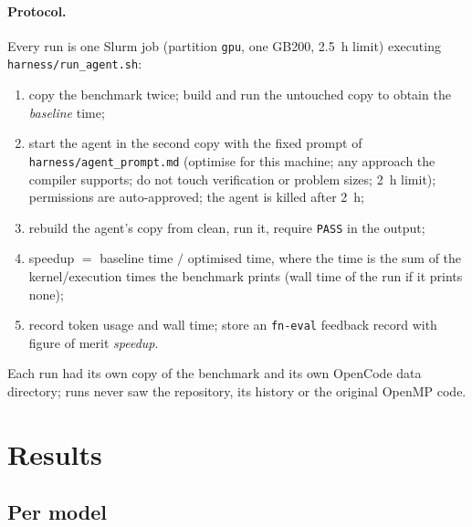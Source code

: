 \documentclass[11pt,a4paper]{article}
\begin{document}
\paragraph{Protocol.}
Every run is one Slurm job (partition \texttt{gpu}, one GB200, \SI{2.5}{h}
limit) executing \texttt{harness/run\_agent.sh}:
\begin{enumerate}
  \item copy the benchmark twice; build and run the untouched copy to obtain the
        \emph{baseline} time;
  \item start the agent in the second copy with the fixed prompt of
        \texttt{harness/agent\_prompt.md} (optimise for this machine; any
        approach the compiler supports; do not touch verification or problem
        sizes; \SI{2}{h} limit); permissions are auto-approved; the agent is
        killed after \SI{2}{h};
  \item rebuild the agent's copy from clean, run it, require \texttt{PASS} in the
        output;
  \item speedup $=$ baseline time $/$ optimised time, where the time is the sum
        of the kernel/execution times the benchmark prints (wall time of the run
        if it prints none);
  \item record token usage and wall time; store an \texttt{fn-eval} feedback
        record with figure of merit \emph{speedup}.
\end{enumerate}
Each run had its own copy of the benchmark and its own OpenCode data directory;
runs never saw the repository, its history or the original OpenMP code.

\section{Results}

\subsection{Per model}

\begin{table}[h]
\centering\footnotesize\setlength{\tabcolsep}{4pt}

\caption{Per-model summary over \nbenchmarks{} benchmarks $\times$ 3 repetitions
(provider prefixes dropped). ``correct'' = compiled, ran and passed the self-check;
``wall'' is the median agent wall time. Bold marks the column maximum in the
$>$\suspiciouscap$\times$ column and those to its right. $^\dagger$Geometric mean
over correct runs with speedup $\le$ \suspiciouscap$\times$; the median is over
all correct runs.}
\label{tab:models}
\end{table}
\end{document}
